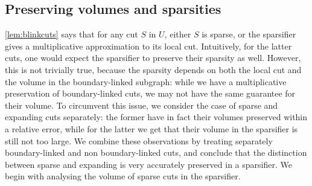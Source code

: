 \documentclass[epsfig,letter,11pt]{article}
\numberwithin{equation}{section}
\begin{document}
\subsection{Preserving volumes and sparsities}
\label{subsec:preservingcuts}
 \cref{lem:blinkcuts} says that for any cut $S$ in $U$, either $S$ is sparse, or the sparsifier gives a multiplicative approximation to its local cut. Intuitively, for the latter cuts, one would expect the sparsifier to preserve their sparsity as well. However, this is not trivially true, because the sparsity depends on both the local cut and the volume in the boundary-linked subgraph: while we have a multiplicative preservation of boundary-linked cuts, we may not have the same guarantee for their volume. To circumvent this issue, we consider the case of sparse and expanding cuts separately: the former have in fact their volumes preserved within a relative error, while for the latter we get that their volume in the sparsifier is still not too large. We combine these observations by treating separately boundary-linked and non boundary-linked cuts, and conclude that the distinction between sparse and expanding is very accurately preserved in a sparsifier. We begin with analysing the volume of sparse cuts in the sparsifier.
\end{document}
